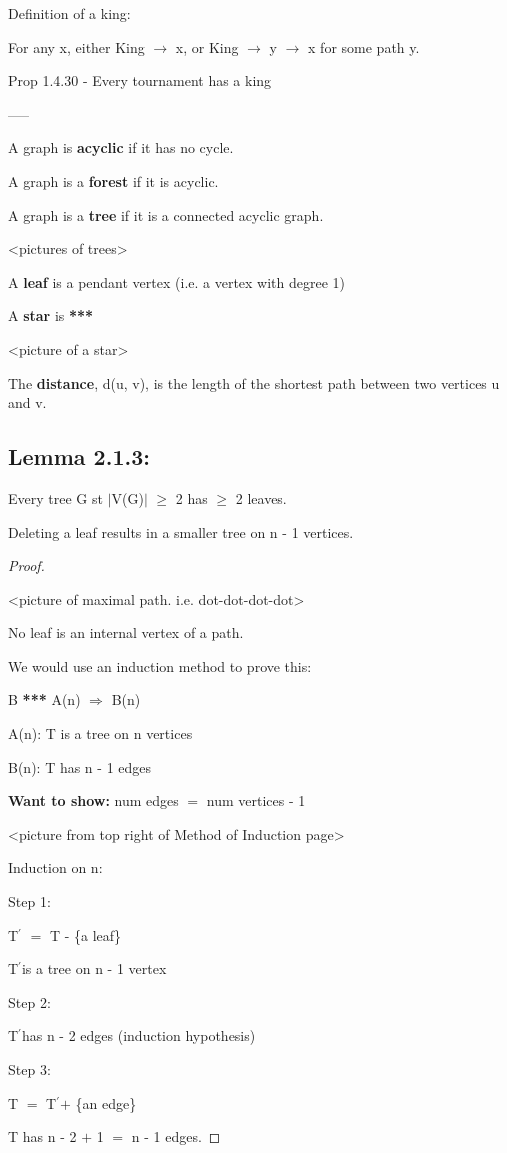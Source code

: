 \documentclass{article}
\newcommand{\mt}[1]{\ensuremath{#1}}
\newcommand\ssc[2][\DefaultOpt]{%
  \def\DefaultOpt{#2}%
  \subsection[#1]{#2}%
}
\newcommand{\bgpf}{\begin{proof} $ $\newline}
\newcommand{\wts}[1]{\textbf{Want to show: } #1}
\newcommand{\epf}{\end{proof}}
\newcommand{\lra}{ \mt{\longrightarrow} } %
\newcommand{\rar}{ \mt{\Rightarrow} }     %
\newcommand{\av}[1]{\mt{|}#1\mt{|}}  %
\newcommand{\bk}[1]{\{#1\}}
\newcommand{\ps}{\mt{\operatorname{+}} }
\newcommand{\ms}{\mt{\operatorname{-}} }
\newcommand{\gre}{\mt{\operatorname{\geq}} }
\newcommand{\eql}{ \mt{\operatorname{=}} }
\newcommand{\pr}{\mt{^\prime}} 		   %
\begin{document}
Definition of a king:

For any x, either King \lra x, or King \lra y \lra x for some path y.

Prop 1.4.30 - Every tournament has a king

-----

A graph is \textbf{acyclic} if it has no cycle.

A graph is a \textbf{forest} if it is acyclic.

A graph is a \textbf{tree} if it is a connected acyclic graph.

<pictures of trees>

A \textbf{leaf} is a pendant vertex (i.e. a vertex with degree 1)

A \textbf{star} is \textbf{***}

<picture of a star>

The \textbf{distance}, d(u, v), is the length of the shortest path between two vertices u and v.

\ssc{Lemma 2.1.3:}{
Every tree G st \av{V(G)} \gre 2 has \gre 2 leaves.

Deleting a leaf results in a smaller tree on n \ms 1 vertices.

\bgpf

<picture of maximal path. i.e. dot-dot-dot-dot>

No leaf is an internal vertex of a path.

We would use an induction method to prove this:

B \textbf{***}  A(n) \rar B(n)

A(n): T is a tree on n vertices

B(n): T has n \ms 1 edges

\wts{num edges \eql num vertices - 1}

<picture from top right of Method of Induction page>

Induction on n:

Step 1: 

T\pr \eql T \ms \bk{a leaf}

T\pr is a tree on n \ms 1 vertex

Step 2:

T\pr has n \ms 2 edges (induction hypothesis)

Step 3:

T \eql T\pr \ps \bk{an edge}

T has n \ms 2 \ps 1 \eql n \ms 1 edges.

\epf

} 
\end{document}
